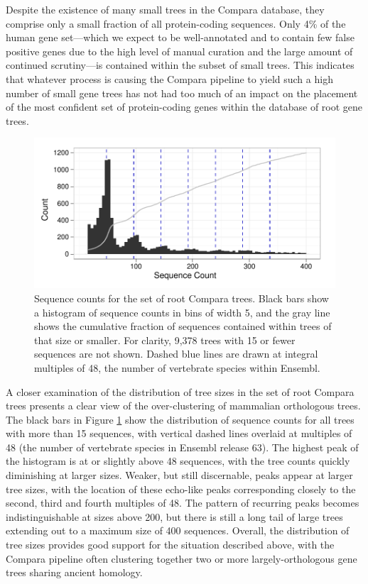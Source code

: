 Despite the existence of many small trees in the Compara database,
they comprise only a small fraction of all protein-coding
sequences. Only 4\% of the human gene set---which we expect to be
well-annotated and to contain few false positive genes due to the high
level of manual curation and the large amount of continued
scrutiny---is contained within the subset of small trees. This
indicates that whatever process is causing the Compara pipeline to
yield such a high number of small gene trees has not had too much of
an impact on the placement of the most confident set of protein-coding
genes within the database of root gene trees.

\begin{figure}[ht]
\centering
\includegraphics[scale=0.9]{Figs/ensembl_roots_hist.pdf}
\caption{Sequence counts for the set of root Compara trees. Black bars
  show a histogram of sequence counts in bins of width 5, and the gray
  line shows the cumulative fraction of sequences contained within
  trees of that size or smaller. For clarity, 9,378 trees with 15 or
  fewer sequences are not shown. Dashed blue lines are drawn at
  integral multiples of 48, the number of vertebrate species within
  Ensembl.}
\label{ensembl_roots_hist}
\end{figure}

A closer examination of the distribution of tree sizes in the set of
root Compara trees presents a clear view of the over-clustering of
mammalian orthologous trees. The black bars in Figure
\ref{ensembl_roots_hist} show the distribution of sequence counts for
all trees with more than 15 sequences, with vertical dashed lines
overlaid at multiples of 48 (the number of vertebrate species in
Ensembl release 63). The highest peak
of the histogram is at or slightly above 48 sequences, with the tree
counts quickly diminishing at larger sizes. Weaker, but still
discernable, peaks appear at larger tree sizes, with the location of
these echo-like peaks corresponding closely to the second, third and
fourth multiples of 48. The pattern of recurring peaks becomes
indistinguishable at sizes above 200, but there is still a long tail
of large trees extending out to a maximum size of 400
sequences. Overall, the distribution of tree sizes provides good
support for the situation described above, with the Compara pipeline
often clustering together two or more largely-orthologous gene trees
sharing ancient homology.

